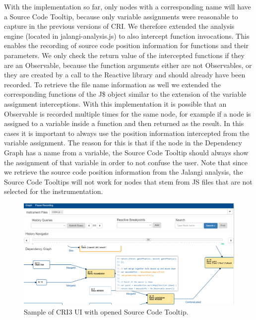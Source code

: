 With the implementation so far, only nodes with a corresponding name will have a Source Code Tooltip, because only variable assignments were reasonable to capture in the previous versions of CRI. We therefore extended the analysis engine (located in jalangi-analysis.js) to also intercept function invocations. This enables the recording of source code position information for functions and their parameters. We only check the return value of the intercepted functions if they are an Observable, because the function arguments either are not Observables, or they are created by a call to the Reactive library and should already have been recorded. To retrieve the file name information as well we extended the corresponding functions of the J\$ object similar to the extension of the variable assignment interceptions. With this implementation it is possible that an Observable is recorded multiple times for the same node, for example if a node is assigned to a variable inside a function and then returned as the result. In this cases it is important to always use the position information intercepted from the variable assignment. The reason for this is that if the node in the Dependency Graph has a name from a variable, the Source Code Tooltip should always show the assignment of that variable in order to not confuse the user. Note that since we retrieve the source code position information from the Jalangi analysis, the Source Code Tooltips will not work for nodes that stem from JS files that are not selected for the instrumentation.\\

\begin{figure}[!h]
	\centering
	\includegraphics[scale=0.5,trim=0 0 0 0]{gfx/CRI-sampleView.png}
	\caption{Sample of CRI3 UI with opened Source Code Tooltip.}
	\label{fig:CRI}
\end{figure}

